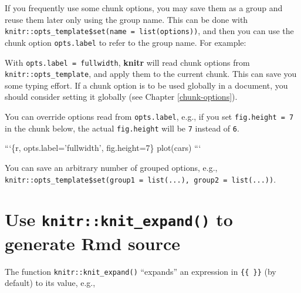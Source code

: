 \documentclass[
  11pt,
]{krantz}
\newenvironment{Shaded}{\begin{snugshade}}{\end{snugshade}}
\newcommand{\BaseNTok}[1]{\textcolor[rgb]{0.06,0.06,0.06}{#1}}
\begin{document}
If you frequently use some chunk options, you may save them as a group and reuse them later only using the group name. This can be done with \texttt{knitr::opts\_template\$set(name\ =\ list(options))}, and then you can use the chunk option \texttt{opts.label} to refer to the group name. For example:

\begin{Shaded}
\end{Shaded}

With \texttt{opts.label\ =\ \textquotesingle{}fullwidth\textquotesingle{}}, \textbf{knitr} will read chunk options from \texttt{knitr::opts\_template}, and apply them to the current chunk. This can save you some typing effort. If a chunk option is to be used globally in a document, you should consider setting it globally (see Chapter \ref{chunk-options}).

You can override options read from \texttt{opts.label}, e.g., if you set \texttt{fig.height\ =\ 7} in the chunk below, the actual \texttt{fig.height} will be \texttt{7} instead of \texttt{6}.

\begin{Shaded}
\begin{Highlighting}[]
\BaseNTok{```\{r, opts.label='fullwidth', fig.height=7\}}
\BaseNTok{plot(cars)}
\BaseNTok{```}
\end{Highlighting}
\end{Shaded}

You can save an arbitrary number of grouped options, e.g., \texttt{knitr::opts\_template\$set(group1\ =\ list(...),\ group2\ =\ list(...))}.

\hypertarget{knit-expand}{%
\section{\texorpdfstring{Use \texttt{knitr::knit\_expand()} to generate Rmd source}{Use knitr::knit\_expand() to generate Rmd source}}\label{knit-expand}}

The function \texttt{knitr::knit\_expand()} ``expands'' an expression in \texttt{\{\{\ \}\}} (by default) to its value, e.g.,
\end{document}
